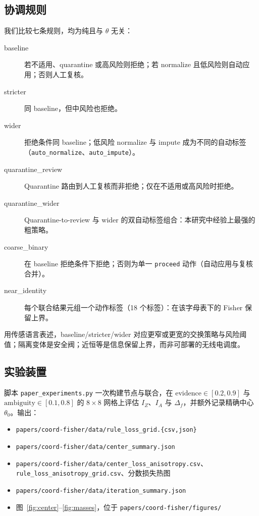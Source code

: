 \documentclass[11pt,a4paper]{article}
\begin{document}
\subsection{协调规则}
\label{sec:rules}

我们比较七条规则，均为纯且与 $\theta$ 无关：

\begin{description}
  \item[baseline] 若不适用、quarantine 或高风险则拒绝；若 normalize 且低风险则自动应用；否则人工复核。
  \item[stricter] 同 baseline，但中风险也拒绝。
  \item[wider] 拒绝条件同 baseline；低风险 normalize 与 impute 成为不同的自动标签（\texttt{auto\_normalize}、\texttt{auto\_impute}）。
  \item[quarantine\_review] Quarantine 路由到人工复核而非拒绝；仅在不适用或高风险时拒绝。
  \item[quarantine\_wider] Quarantine-to-review 与 wider 的双自动标签组合：本研究中经验上最强的粗策略。
  \item[coarse\_binary] 在 baseline 拒绝条件下拒绝；否则为单一 \texttt{proceed} 动作（自动应用与复核合并）。
  \item[near\_identity] 每个联合结果元组一个动作标签（18 个标签）：在该字母表下的 Fisher 保留上界。
\end{description}

用传感语言表述，baseline/stricter/wider 对应更窄或更宽的交换策略与风险阈值；隔离变体是安全阀；近恒等是信息保留上界，而非可部署的无线电调度。

\subsection{实验装置}

脚本 \texttt{paper\_experiments.py} 一次构建节点与联合，在 $\mathrm{evidence}\in[0.2,0.9]$ 与 $\mathrm{ambiguity}\in[0.1,0.8]$ 的 $8\times 8$ 网格上评估 $I_Z$、$I_A$ 与 $\Delta_f$，并额外记录精确中心 $\theta_0$。输出：

\begin{itemize}
  \item \texttt{papers/coord-fisher/data/rule\_loss\_grid.\{csv,json\}}
  \item \texttt{papers/coord-fisher/data/center\_summary.json}
  \item \texttt{papers/coord-fisher/data/center\_loss\_anisotropy.csv}、
  \texttt{rule\_loss\_anisotropy\_grid.csv}、分数损失热图
  \item \texttt{papers/coord-fisher/data/iteration\_summary.json}
  \item 图~\ref{fig:center}--\ref{fig:masses}，位于
  \texttt{papers/coord-fisher/figures/}
\end{itemize}
\end{document}
